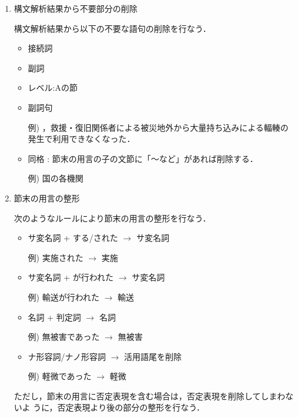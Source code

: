 \begin{enumerate}
\item 構文解析結果から不要部分の削除

構文解析結果から以下の不要な語句の削除を行なう．

\begin{itemize}
 \item 接続詞
 \item 副詞
 \item レベル:Aの節
 \item 副詞句

  例) ，救援・復旧関係者による被災地外から大量持ち込みによる輻輳の発生で利用できなくなった．

 \item 同格 : 節末の用言の子の文節に「〜など」があれば削除する．

  例) 国の各機関

\end{itemize}

\item 節末の用言の整形

次のようなルールにより節末の用言の整形を行なう．

\begin{itemize}
 \item サ変名詞 + する/された $\rightarrow$ サ変名詞

 例) 実施された $\rightarrow$ 実施

 \item サ変名詞 + が行われた $\rightarrow$ サ変名詞

 例) 輸送が行われた $\rightarrow$ 輸送

 \item 名詞 + 判定詞 $\rightarrow$ 名詞

 例) 無被害であった $\rightarrow$ 無被害

 \item ナ形容詞/ナノ形容詞 $\rightarrow$ 活用語尾を削除

 例) 軽微であった $\rightarrow$ 軽微
\end{itemize}

ただし，節末の用言に否定表現を含む場合は，否定表現を削除してしまわないよ
      うに，否定表現より後の部分の整形を行なう．

\end{enumerate}


